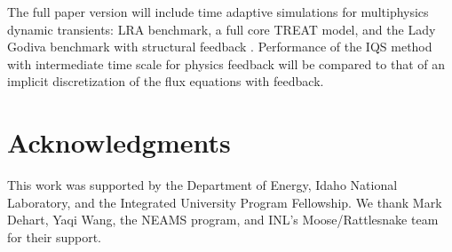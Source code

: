 \documentclass{anstrans}
\begin{document}
The full paper version will include time adaptive simulations for multiphysics dynamic transients: LRA benchmark, a full core TREAT model, and the Lady Godiva benchmark with structural feedback \cite{CritSafetyHandbook}. Performance of the IQS method with intermediate time scale for physics feedback will be compared to that of an implicit discretization of the flux equations with feedback. 


\section{Acknowledgments}
This work was supported by the Department of Energy, Idaho National Laboratory, and the Integrated University Program Fellowship.  
We thank Mark Dehart, Yaqi Wang, the NEAMS program, and INL's Moose/Rattlesnake team for their support.



\end{document}
